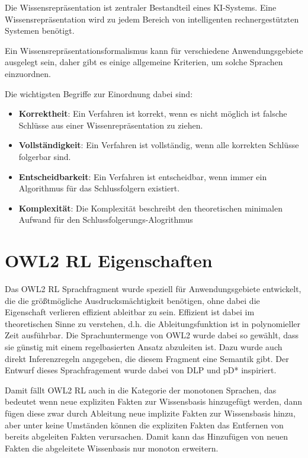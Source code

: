 Die Wissensrepräsentation ist zentraler Bestandteil eines KI-Systems. Eine Wissensrepräsentation wird zu jedem Bereich von intelligenten rechnergestützten Systemen benötigt.

Ein Wissensrepräsentationsformalismus kann für verschiedene Anwendungsgebiete ausgelegt sein, daher gibt es einige allgemeine Kriterien, um solche Sprachen einzuordnen.

Die wichtigsten Begriffe zur Einordnung dabei sind:
\begin{itemize}
	\item \textbf{Korrektheit}:
Ein Verfahren ist korrekt, wenn es nicht möglich ist falsche Schlüsse aus einer Wissenrepräsentation zu ziehen.
	\item \textbf{Vollständigkeit}:
Ein Verfahren ist vollständig, wenn alle korrekten Schlüsse folgerbar sind.
	\item \textbf{Entscheidbarkeit}:
Ein Verfahren ist entscheidbar, wenn immer ein Algorithmus für das Schlussfolgern existiert.
	\item \textbf{Komplexität}:
Die Komplexität beschreibt den theoretischen minimalen Aufwand für den Schlussfolgerungs-Alogrithmus
\end{itemize}

\section{OWL2 RL Eigenschaften}
Das OWL2 RL Sprachfragment wurde speziell für Anwendungsgebiete entwickelt, die die größtmögliche Ausdrucksmächtigkeit benötigen, ohne dabei die Eigenschaft verlieren effizient ableitbar zu sein. Effizient ist dabei im theoretischen Sinne zu verstehen, d.h. die Ableitungsfunktion ist in polynomieller Zeit ausführbar. Die Sprachuntermenge von OWL2 wurde dabei so gewählt, dass sie günstig mit einem regelbasierten Ansatz abzuleiten ist. Dazu wurde auch direkt Inferenzregeln angegeben, die diesem Fragment eine Semantik gibt. Der Entwurf dieses Sprachfragement wurde dabei von DLP \cite{Grosof2003} und pD* \cite{Li2006} inspiriert.

Damit fällt OWL2 RL auch in die Kategorie der monotonen Sprachen, das bedeutet wenn neue expliziten Fakten zur Wissensbasis hinzugefügt werden, dann fügen diese zwar durch Ableitung neue implizite Fakten zur Wissensbasis hinzu, aber unter keine Umständen können die expliziten Fakten das Entfernen von bereits abgeleiten Fakten verursachen. Damit kann das Hinzufügen von neuen Fakten die abgeleitete Wissenbasis nur monoton erweitern.


